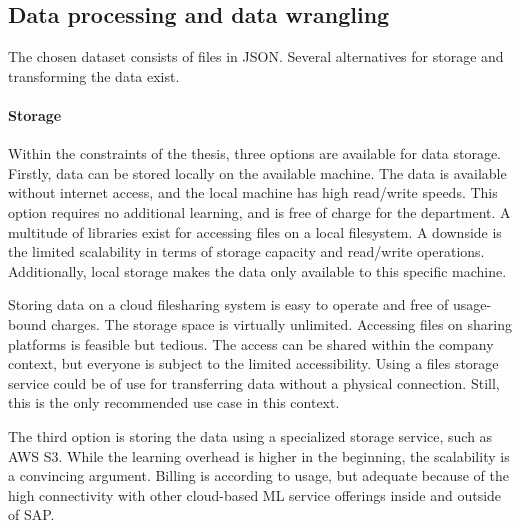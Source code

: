         \subsection{Data processing and data wrangling}
        The chosen dataset consists of files in \ac{JSON}. Several alternatives for storage and transforming the data exist. 
        
        \paragraph{Storage}
        Within the constraints of the thesis, three options are available for data storage. Firstly, data can be stored locally on the available machine. The data is available without internet access, and the local machine has high read/write speeds. This option requires no additional learning, and is free of charge for the department. A multitude of libraries exist for accessing files on a local filesystem. A downside is the limited scalability in terms of storage capacity and read/write operations. Additionally, local storage makes the data only available to this specific machine.
        
        Storing data on a cloud filesharing system is easy to operate and free of usage-bound charges. The storage space is virtually unlimited. Accessing files on sharing platforms is feasible but tedious. The access can be shared within the company context, but everyone is subject to the limited accessibility. Using a files storage service could be of use for transferring data without a physical connection. Still, this is the only recommended use case in this context.
        
        The third option is storing the data using a specialized storage service, such as AWS S3. While the learning overhead is higher in the beginning, the scalability is a convincing argument. Billing is according to usage, but adequate because of the high connectivity with other cloud-based ML service offerings inside and outside of SAP.
        
